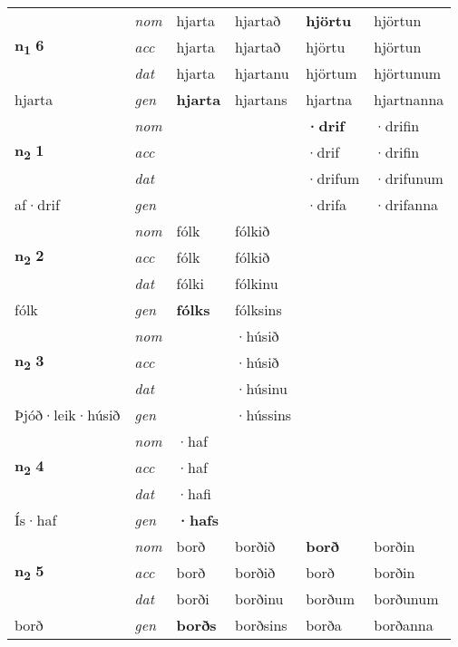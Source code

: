 \begin{longtable}[l]{X>{\footnotesize\itshape}XXXXX}
\multirow{3}{*}{{{\textbf{n{\textsubscript{1}}} \Large{\textbf{6}}}}} & nom & hjarta & hjartað & \textbf{hjörtu} & hjörtun \\*
 & acc & hjarta & hjartað & hjörtu & hjörtun \\*
 & dat & hjarta & hjartanu & hjörtum & hjörtunum \\*
 {\footnotesize{hjarta}} & gen & \textbf{hjarta} & hjartans & hjartna & hjartnanna \\
\cmidrule{1-6}

\multirow{3}{*}{{{\textbf{n{\textsubscript{2}}} \Large{\textbf{1}}}}} & nom &  &  & \textbf{·drif} & ·drifin \\*
 & acc &  &  & ·drif & ·drifin \\*
 & dat &  &  & ·drifum & ·drifunum \\*
 {\footnotesize{af\allowbreak ·drif}} & gen & \textbf{} &  & ·drifa & ·drifanna \\
\cmidrule{1-6}

\multirow{3}{*}{{{\textbf{n{\textsubscript{2}}} \Large{\textbf{2}}}}} & nom & fólk & fólkið & \textbf{} &  \\*
 & acc & fólk & fólkið &  &  \\*
 & dat & fólki & fólkinu &  &  \\*
 {\footnotesize{fólk}} & gen & \textbf{fólks} & fólksins &  &  \\
\cmidrule{1-6}

\multirow{3}{*}{{{\textbf{n{\textsubscript{2}}} \Large{\textbf{3}}}}} & nom &  & ·húsið & \textbf{} &  \\*
 & acc &  & ·húsið &  &  \\*
 & dat &  & ·húsinu &  &  \\*
 {\footnotesize{Þjóð\allowbreak ·leik\allowbreak ·húsið}} & gen & \textbf{} & ·hússins &  &  \\
\cmidrule{1-6}

\multirow{3}{*}{{{\textbf{n{\textsubscript{2}}} \Large{\textbf{4}}}}} & nom & ·haf &  & \textbf{} &  \\*
 & acc & ·haf &  &  &  \\*
 & dat & ·hafi &  &  &  \\*
 {\footnotesize{Ís\allowbreak ·haf}} & gen & \textbf{·hafs} &  &  &  \\
\cmidrule{1-6}

\multirow{3}{*}{{{\textbf{n{\textsubscript{2}}} \Large{\textbf{5}}}}} & nom & borð & borðið & \textbf{borð} & borðin \\*
 & acc & borð & borðið & borð & borðin \\*
 & dat & borði & borðinu & borðum & borðunum \\*
 {\footnotesize{borð}} & gen & \textbf{borðs} & borðsins & borða & borðanna \\
\cmidrule{1-6}


\end{longtable}
